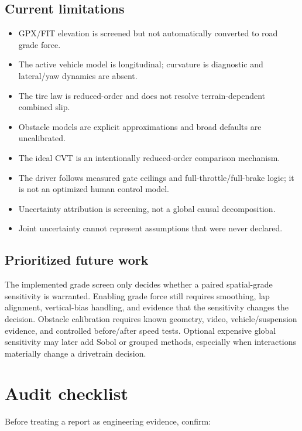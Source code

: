 \documentclass[11pt,oneside]{report}
\begin{document}
\section{Current limitations}

\begin{itemize}
  \item GPX/FIT elevation is screened but not automatically converted to road grade force.
  \item The active vehicle model is longitudinal; curvature is diagnostic and lateral/yaw
        dynamics are absent.
  \item The tire law is reduced-order and does not resolve terrain-dependent combined slip.
  \item Obstacle models are explicit approximations and broad defaults are uncalibrated.
  \item The ideal CVT is an intentionally reduced-order comparison mechanism.
  \item The driver follows measured gate ceilings and full-throttle/full-brake logic; it
        is not an optimized human control model.
  \item Uncertainty attribution is screening, not a global causal decomposition.
  \item Joint uncertainty cannot represent assumptions that were never declared.
\end{itemize}

\section{Prioritized future work}

The implemented grade screen only decides whether a paired spatial-grade sensitivity is
warranted. Enabling grade force still requires smoothing, lap alignment, vertical-bias
handling, and evidence that the sensitivity changes the decision. Obstacle calibration requires known
geometry, video, vehicle/suspension evidence, and controlled before/after speed tests.
Optional expensive global sensitivity may later add Sobol or grouped methods,
especially when interactions materially change a drivetrain decision.

\chapter{Audit checklist}\label{ch:audit}

Before treating a report as engineering evidence, confirm:
\end{document}
